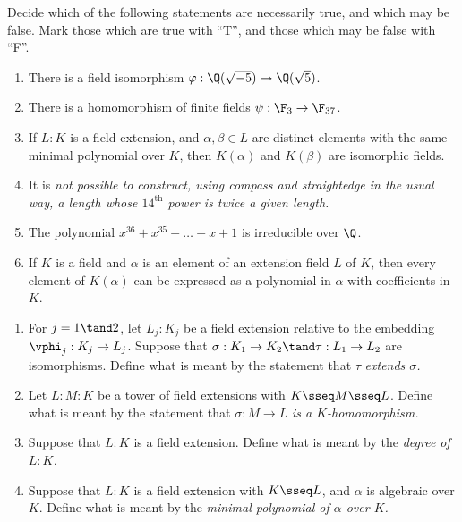 \documentclass{article}
\begin{document}
\setcounter{section}{1}

 Decide which of the following statements are necessarily true, and which may be false.
Mark those which are true with ``T'', and those which may be false with ``F''.
\begin{enumerate}[label=(\alph*)]
  \item There is a field isomorphism \( \varphi : \Q(\sqrt{-5}) \to \Q(\sqrt{5}) \).
  \item There is a homomorphism of finite fields \( \psi : \F_3 \to \F_{37} \).
  \item If \( L : K \) is a field extension, and \( \alpha, \beta \in L \) are distinct elements with the same minimal polynomial over \( K \), then \( K(\alpha) \) and \( K(\beta) \) are isomorphic fields.
  \item It is \it{not} possible to construct, using compass and straightedge in the usual way, a length whose \( 14^{\mathrm{th}} \) power is twice a given length.
  \item The polynomial \( x^{36} + x^{35} + \dots + x + 1 \) is irreducible over \( \Q \).
  \item If \( K \) is a field and \( \alpha \) is an element of an extension field \( L \) of \( K \), then every element of \( K(\alpha) \) can be expressed as a polynomial in \( \alpha \) with coefficients in \( K \).
\end{enumerate}


\begin{enumerate}[label=(\alph*)]
  \item For \( j=1\tand 2 \), let \( L_j:K_j \) be a field extension relative to the embedding \( \vphi_j:K_j\to L_j \).
    Suppose that \( \sigma:K_1\to K_2 \tand \tau:L_1\to L_2 \) are isomorphisms.
    Define what is meant by the statement that \( \tau \) \it{extends} \( \sigma \).
  \item Let \( L : M : K \) be a tower of field extensions with \( K\sseq M\sseq L \).
  Define what is meant by the statement that \( \sigma : M \to L \) \it{is a \( K \)-homomorphism}.

  \item Suppose that \( L:K \) is a field extension.
  Define what is meant by the \it{degree} of \( L : K \).

  \item Suppose that \( L:K \) is a field extension with \( K\sseq L \), and \( \alpha \) is algebraic over \( K \). Define what is meant by the \it{minimal polynomial} of \( \alpha \) over \( K \).
\end{enumerate}
\end{document}
